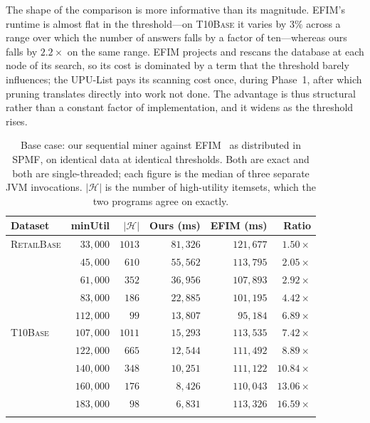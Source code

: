 \documentclass[pdflatex,sn-vancouver-num]{sn-jnl}
\theoremstyle{thmstyleone}%
\theoremstyle{thmstyletwo}%
\theoremstyle{thmstylethree}%
\begin{document}
The shape of the comparison is more informative than its magnitude.
EFIM's runtime is almost flat in the threshold---on \textsc{T10Base} it
varies by $3\%$ across a range over which the number of answers falls by
a factor of ten---whereas ours falls by $2.2\times$ on the same range.
EFIM projects and rescans the database at each node of its search, so
its cost is dominated by a term that the threshold barely influences;
the UPU-List pays its scanning cost once, during Phase~1, after which
pruning translates directly into work not done. The advantage is thus
structural rather than a constant factor of implementation, and it
widens as the threshold rises.
 
\begin{table}[t]
\caption{Base case: our sequential miner against EFIM~\cite{zida2017efim}
as distributed in SPMF, on identical data at identical thresholds. Both
are exact and both are single-threaded; each figure is the median of
three separate JVM invocations. $|\mathcal{H}|$ is the number of
high-utility itemsets, which the two programs agree on exactly.}
\label{tab:basecase}
\footnotesize\setlength{\tabcolsep}{6pt}
\begin{tabular}{@{}lrrrrr@{}}
\toprule
Dataset & minUtil & $|\mathcal{H}|$ & Ours (ms) & EFIM (ms) & Ratio \\
\midrule
\textsc{RetailBase}
  & $33{,}000$  & $1013$ & $81{,}326$ & $121{,}677$ & $1.50\times$ \\
  & $45{,}000$  & $610$  & $55{,}562$ & $113{,}795$ & $2.05\times$ \\
  & $61{,}000$  & $352$  & $36{,}956$ & $107{,}893$ & $2.92\times$ \\
  & $83{,}000$  & $186$  & $22{,}885$ & $101{,}195$ & $4.42\times$ \\
  & $112{,}000$ & $99$   & $13{,}807$ & $95{,}184$  & $6.89\times$ \\
\midrule
\textsc{T10Base}
  & $107{,}000$ & $1011$ & $15{,}293$ & $113{,}535$ & $7.42\times$ \\
  & $122{,}000$ & $665$  & $12{,}544$ & $111{,}492$ & $8.89\times$ \\
  & $140{,}000$ & $348$  & $10{,}251$ & $111{,}122$ & $10.84\times$ \\
  & $160{,}000$ & $176$  & $8{,}426$  & $110{,}043$ & $13.06\times$ \\
  & $183{,}000$ & $98$   & $6{,}831$  & $113{,}326$ & $16.59\times$ \\
\botrule
\end{tabular}
\end{table}
 
\end{document}
